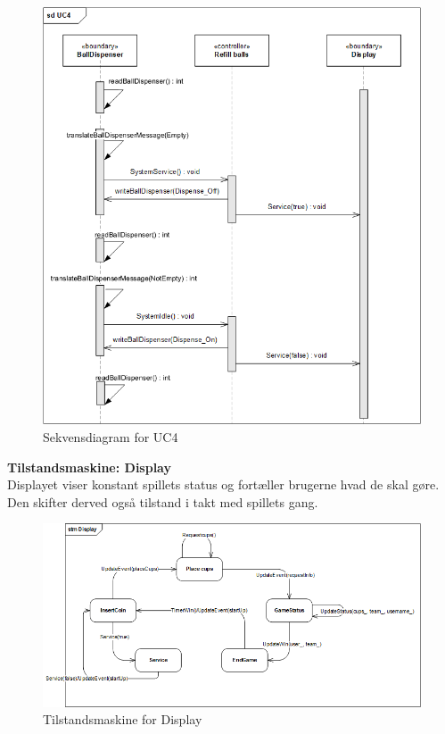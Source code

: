 \documentclass[Arkitektur/System_main.tex]{subfiles}
\begin{document}
\begin{figure}[H]
    \centering
    \includegraphics[width=\textwidth]{Arkitektur/Softwarearkitektur/Applikationsmodel/RPi/graphics_RPi/UC4_SD.png}
   \caption{Sekvensdiagram for UC4}
    \label{fig:UC4_SD_RPi}
\end{figure}

\textbf{Tilstandsmaskine: Display}\\
Displayet viser konstant spillets status og fortæller brugerne hvad de skal gøre. Den skifter derved også tilstand i takt med spillets gang. 

\begin{figure}[H]
    \centering
    \includegraphics[width=\textwidth]{Arkitektur/Softwarearkitektur/Applikationsmodel/RPi/graphics_RPi/stm_disp.png}
    \caption{Tilstandsmaskine for Display}
    \label{fig:stm_disp}
\end{figure}
\end{document}
